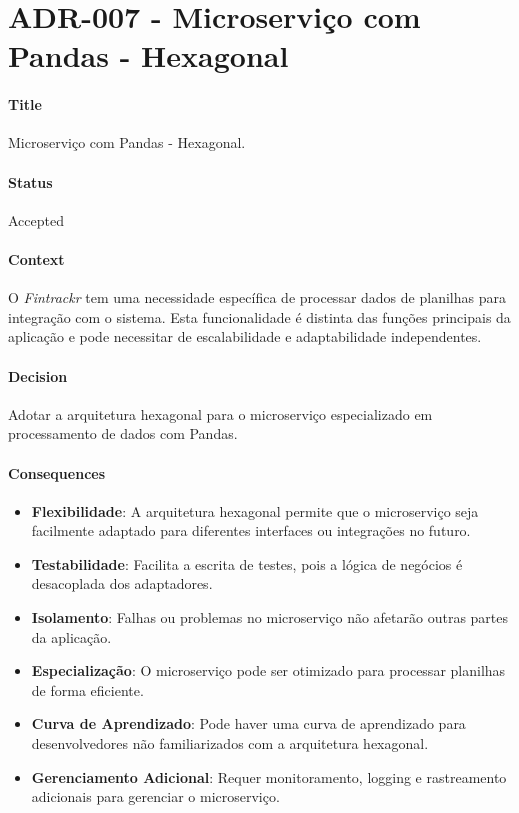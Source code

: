 
\chapter{ADR-007 - Microserviço com Pandas - Hexagonal}
\label{apendiceADR007}

\subsubsection*{Title}
Microserviço com Pandas - Hexagonal.

\subsubsection*{Status}
Accepted

\subsubsection*{Context}
O \textit{Fintrackr} tem uma necessidade específica de processar dados de planilhas para integração com o sistema. Esta funcionalidade é distinta das funções principais da aplicação e pode necessitar de escalabilidade e adaptabilidade independentes.

\subsubsection*{Decision}
Adotar a arquitetura hexagonal para o microserviço especializado em processamento de dados com Pandas.

\subsubsection*{Consequences}
\begin{itemize}
	\item \textbf{Flexibilidade}: A arquitetura hexagonal permite que o microserviço seja facilmente adaptado para diferentes interfaces ou integrações no futuro.
	\item \textbf{Testabilidade}: Facilita a escrita de testes, pois a lógica de negócios é desacoplada dos adaptadores.
	\item \textbf{Isolamento}: Falhas ou problemas no microserviço não afetarão outras partes da aplicação.
	\item \textbf{Especialização}: O microserviço pode ser otimizado para processar planilhas de forma eficiente.
	\item \textbf{Curva de Aprendizado}: Pode haver uma curva de aprendizado para desenvolvedores não familiarizados com a arquitetura hexagonal.
	\item \textbf{Gerenciamento Adicional}: Requer monitoramento, logging e rastreamento adicionais para gerenciar o microserviço.
\end{itemize}
